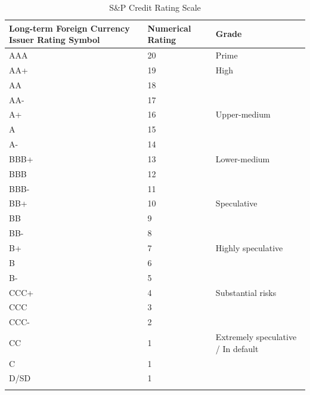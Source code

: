 
\begin{table}[tb!]
\footnotesize
\centering
\caption{S\&P Credit Rating Scale}
\label{tab:tab5}
\begin{tabularx}{\textwidth}{p{4cm} p{3cm} p{4cm} }
\hline
Long-term Foreign Currency Issuer Rating Symbol & Numerical Rating & Grade \\
\hline
AAA & 20 & Prime \\
AA+ & 19 & High \\
AA & 18 & \\
AA- & 17 & \\
A+ & 16 & Upper-medium \\
A & 15 & \\
A- & 14 & \\
BBB+ & 13 & Lower-medium \\
BBB & 12 & \\
BBB- & 11 & \\
BB+ & 10 & Speculative \\
BB & 9 & \\
BB- & 8 & \\
B+ & 7 & Highly speculative \\
B & 6 & \\
B- & 5 & \\
CCC+ & 4 & Substantial risks \\
CCC & 3 & \\
CCC- & 2 & \\
CC & 1 & Extremely speculative / In default \\
C & 1 & \\
D/SD & 1 & \\
\hline
\multicolumn{3}{p{\textwidth}}{\begin{footnotesize}
\end{footnotesize}
}
\end{tabularx}
\end{table}
